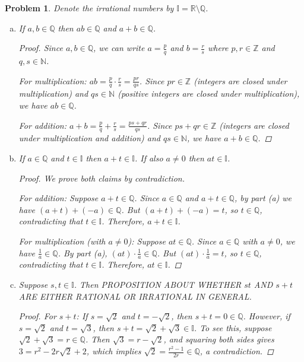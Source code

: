 \documentclass[12pt]{article}
\newtheorem{problem}{Problem}
\newcommand{\QQ}{\ensuremath{\mathbb Q}}
\newcommand{\RR}{\ensuremath{\mathbb R}}
\newcommand{\NN}{\ensuremath{\mathbb N}}
\newcommand{\ZZ}{\ensuremath{\mathbb Z}}
\begin{document}
\begin{problem} %
\newcommand{\II}{\mathbb{I}}
Denote the irrational numbers by $\II = \RR \setminus \QQ$.
\begin{enumerate}[(a)]
\item If $a,b\in\QQ$ then $ab\in\QQ$ and $a+b\in\QQ$.

\begin{proof}
Since $a, b \in \QQ$, we can write $a = \frac{p}{q}$ and $b = \frac{r}{s}$ where $p, r \in \ZZ$ and $q, s \in \NN$.

For multiplication: $ab = \frac{p}{q} \cdot \frac{r}{s} = \frac{pr}{qs}$. Since $pr \in \ZZ$ (integers are closed under multiplication) and $qs \in \NN$ (positive integers are closed under multiplication), we have $ab \in \QQ$.

For addition: $a + b = \frac{p}{q} + \frac{r}{s} = \frac{ps + qr}{qs}$. Since $ps + qr \in \ZZ$ (integers are closed under multiplication and addition) and $qs \in \NN$, we have $a + b \in \QQ$.
\end{proof}

\item If $a\in\QQ$ and $t\in\II$ then $a+t\in\II$.  If also $a\neq 0$ then $at\in\II$.

\begin{proof}
We prove both claims by contradiction.

For addition: Suppose $a + t \in \QQ$. Since $a \in \QQ$ and $a + t \in \QQ$, by part (a) we have $(a + t) + (-a) \in \QQ$. But $(a + t) + (-a) = t$, so $t \in \QQ$, contradicting that $t \in \II$. Therefore, $a + t \in \II$.

For multiplication (with $a \neq 0$): Suppose $at \in \QQ$. Since $a \in \QQ$ with $a \neq 0$, we have $\frac{1}{a} \in \QQ$. By part (a), $(at) \cdot \frac{1}{a} \in \QQ$. But $(at) \cdot \frac{1}{a} = t$, so $t \in \QQ$, contradicting that $t \in \II$. Therefore, $at \in \II$.
\end{proof}

\item Suppose $s,t\in\II$.  Then PROPOSITION ABOUT WHETHER $st$ AND $s+t$ ARE EITHER RATIONAL OR IRRATIONAL IN GENERAL.



\begin{proof}
For $s + t$: If $s = \sqrt{2}$ and $t = -\sqrt{2}$, then $s + t = 0 \in \QQ$. However, if $s = \sqrt{2}$ and $t = \sqrt{3}$, then $s + t = \sqrt{2} + \sqrt{3} \in \II$. To see this, suppose $\sqrt{2} + \sqrt{3} = r \in \QQ$. Then $\sqrt{3} = r - \sqrt{2}$, and squaring both sides gives $3 = r^2 - 2r\sqrt{2} + 2$, which implies $\sqrt{2} = \frac{r^2 - 1}{2r} \in \QQ$, a contradiction.


\end{proof}
\end{enumerate}
\end{problem}
\end{document}
